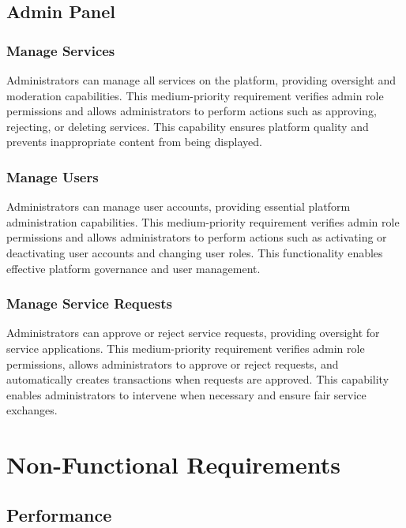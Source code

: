 \documentclass[12pt,a4paper]{report}
\begin{document}
\subsection{Admin Panel}

\subsubsection{Manage Services}

Administrators can manage all services on the platform, providing oversight and moderation capabilities. This medium-priority requirement verifies admin role permissions and allows administrators to perform actions such as approving, rejecting, or deleting services. This capability ensures platform quality and prevents inappropriate content from being displayed.

\subsubsection{Manage Users}

Administrators can manage user accounts, providing essential platform administration capabilities. This medium-priority requirement verifies admin role permissions and allows administrators to perform actions such as activating or deactivating user accounts and changing user roles. This functionality enables effective platform governance and user management.

\subsubsection{Manage Service Requests}

Administrators can approve or reject service requests, providing oversight for service applications. This medium-priority requirement verifies admin role permissions, allows administrators to approve or reject requests, and automatically creates transactions when requests are approved. This capability enables administrators to intervene when necessary and ensure fair service exchanges.

\section{Non-Functional Requirements}

\subsection{Performance}
\end{document}
